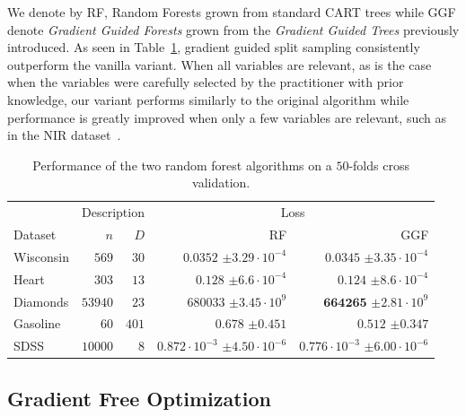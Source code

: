 We denote by RF, Random Forests grown from standard CART trees while GGF denote \emph{Gradient Guided Forests} grown from the \emph{Gradient Guided Trees} previously introduced. As seen in Table~\ref{table:results}, gradient guided split sampling consistently outperform the vanilla variant. When all variables are relevant, as is the case when the variables were carefully selected by the practitioner with prior knowledge, our variant performs similarly to the original algorithm while performance is greatly improved when only a few variables are relevant, such as in the NIR dataset~\citep{portierBootstrapTestingRank2014}.
\begin{table}
    \centering
    \begin{tabular}{@{}lrrrr@{}}
        & \multicolumn{2}{c}{Description} & \multicolumn{2}{c}{Loss} \\
        \cmidrule(l){2-3} \cmidrule(l){4-5}
        Dataset & $n$ & $D$ & RF & GGF \\
        \midrule
        Wisconsin & $569$ & $30$ & \thead{$0.0352$ \\ $\pm 3.29\cdot 10^{-4}$} & \thead{$\mathbf{0.0345}$ \\ $\pm 3.35 \cdot 10^{-4}$} \\
        Heart & $303$ & $13$ & \thead{$0.128$ \\ $\pm 6.6\cdot 10^{-4}$} & \thead{$\mathbf{0.124}$ \\ $\pm 8.6\cdot 10^{-4}$} \\
        Diamonds & $53940$ & $23$ & \thead{$680033$ \\ $\pm 3.45\cdot 10^{9}$} & \thead{$\mathbf{664265}$ \\ $\pm 2.81\cdot 10^{9}$} \\
        Gasoline & $60$ & $401$ & \thead{$0.678$ \\ $\pm 0.451$} & \thead{$\mathbf{0.512}$ \\ $\pm 0.347$} \\
        SDSS & $10000$ & $8$ & \thead{$0.872\cdot 10^{-3}$ \\ $\pm 4.50\cdot 10^{-6}$} & \thead{$\mathbf{0.776}\cdot 10^{-3}$ \\ $\pm 6.00\cdot 10^{-6}$} \\
        \bottomrule
    \end{tabular}
    \caption{Performance of the two random forest algorithms on a $50$-folds cross validation.}\label{table:results}
\end{table}


\subsection{Gradient Free Optimization}


